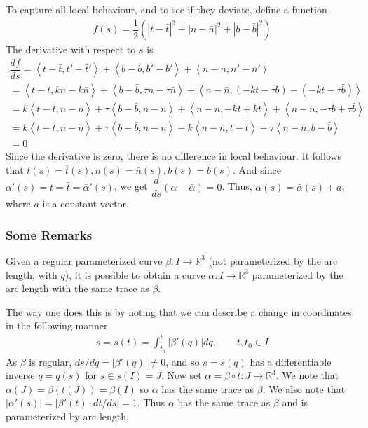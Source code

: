\documentclass{article}
\newcommand{\R}{\mathbb{R}}
\begin{document}
	To capture all local behaviour, and to see if they deviate, define a function
	\begin{gather*}
		f(s) = \dfrac{1}{2} \left( |t - \bar{t}|^2 + |n - \bar{n}|^2 + |b - \bar{b}|^2 \right)
	\end{gather*}
	The derivative with respect to $s$ is
	\begin{gather*}
		\dfrac{df}{ds} = 
		\left\langle t - \bar{t}, t' - \bar{t}' \right\rangle + 
		\left\langle b - \bar{b}, b' - \bar{b}' \right\rangle + 
		\left\langle n - \bar{n}, n' - \bar{n}' \right\rangle \\
		= 
		\left\langle t - \bar{t}, kn - k\bar{n} \right\rangle + 
		\left\langle b - \bar{b}, \tau n - \tau \bar{n} \right\rangle + 
		\left\langle n - \bar{n}, (-kt - \tau b) - (-k\bar{t} - \tau \bar{b}) \right\rangle \\
		=
		k \left\langle t - \bar{t}, n - \bar{n} \right\rangle + 
		\tau \left\langle b - \bar{b}, n - \bar{n} \right\rangle +
		\left\langle n - \bar{n}, -kt + k\bar{t} \right\rangle + 
		\left\langle n - \bar{n}, -\tau b + \tau \bar{b} \right\rangle \\
		= 
		k \left\langle t - \bar{t}, n - \bar{n} \right\rangle + 
		\tau \left\langle b - \bar{b}, n - \bar{n} \right\rangle -
		k \left\langle n - \bar{n}, t - \bar{t} \right\rangle - 
		\tau \left\langle n - \bar{n}, b - \bar{b} \right\rangle \\
		= 0
	\end{gather*}
	Since the derivative is zero, there is no difference in local behaviour. It follows that $t(s) = \bar{t}(s), n(s) = \bar{n}(s), b(s) = \bar{b}(s)$. And since $\alpha'(s) = t = \bar{t} = \bar{\alpha}'(s)$, we get $\dfrac{d}{ds} \left( \alpha - \bar{\alpha} \right) = 0$. Thus, $\alpha(s) = \bar{\alpha}(s) + a$, where $a$ is a constant vector.
	
	\subsubsection*{Some Remarks}
	Given a regular parameterized curve $\beta \colon I \to \R^3$ (not parameterized by the arc length, with $q$), it is possible to obtain a curve $\alpha \colon I \to \R^3$ parameterized by the arc length with the same trace as $\beta$. 
	
	The way one does this is by noting that we can describe a change in coordinates in the following manner
	\begin{gather*}
		s = s(t) = \int_{t_0}^t |\beta'(q)| dq, \qquad t, t_0 \in I
	\end{gather*}
	As $\beta$ is regular, $ds/dq = |\beta'(q)| \neq 0$, and so $s = s(q)$ has a differentiable inverse $q = q(s)$ for $s \in s(I) = J$. Now set $\alpha = \beta \circ t : J \to \R^3$. We note that $\alpha(J) = \beta(t(J)) = \beta(I)$ so $\alpha$ has the same trace as $\beta$. We also note that $|\alpha'(s)| = |\beta'(t) \cdot dt/ds| = 1$. Thus $\alpha$ has the same trace as $\beta$ and is parameterized by arc length.
	
\end{document}
